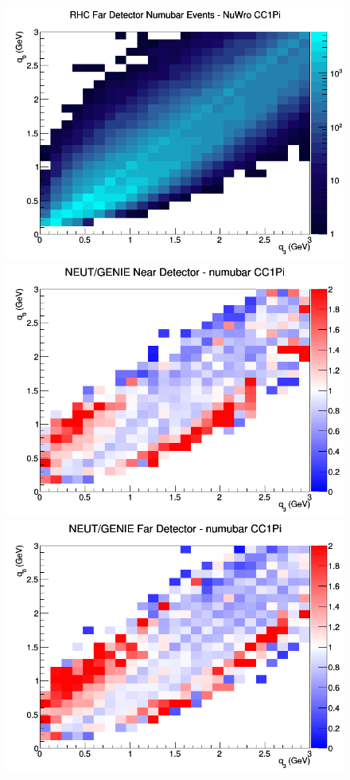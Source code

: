 \documentclass[12pt]{article}
\begin{document}
\begin{figure}[h]
\endminipage
{}
\includegraphics[width=\linewidth]{eff_q0_q3/LAr/CC1Pi_RHC_FD_numubar_q3_q0_NuWro.png}
\endminipage
\newline
{}
\includegraphics[width=\linewidth]{eff_q0_q3/LAr/ratios/CC1Pi_NEUT_GENIE_numubar_near_q3_q0.png}
\endminipage
{}
\includegraphics[width=\linewidth]{eff_q0_q3/LAr/ratios/CC1Pi_NEUT_GENIE_numubar_far_q3_q0.png}

\end{figure}
\end{document}
